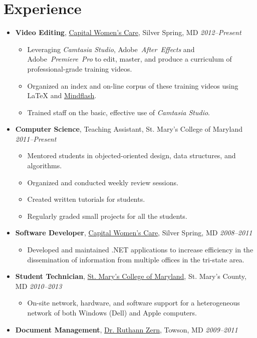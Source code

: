\documentclass[11pt,letterpaper]{article}
\makeatletter
\newcommand{\position}[5]{\item%
  \begin{tabular*}{1.0\linewidth}{l@{\extracolsep{\fill}}r}
    #1 & #2\\
    \textit{#3} & \textit{#4---#5}
  \end{tabular*}}
\renewcommand{\position}[6][]{%
\item[#1] \hspace*{-2em}\textbf{#4}, #2, #3\hfill
  \textit{#5--#6}\vspace*{-.8em}}
\newcommand{\cwc}{\href{http://www.cwcare.net}{Capital Women's Care}}
\newcommand{\software}[1]{\textsl{#1}}
\makeatother
\begin{document}
\section*{Experience}
\begin{itemize}
\position \cwc
          {Silver Spring, MD}
          {Video Editing}
          {2012}{Present}
          \begin{itemize}
          \item Leveraging \software{Camtasia Studio},
            Adobe~\software{After~Effects} and
            Adobe~\software{Premiere~Pro} to edit, master, and produce
            a curriculum of professional-grade training videos.
          \item Organized an index and on-line corpus of these training
            videos using \LaTeX{} and
            \href{http://www.mindflash.com/}{Mindflash}.
          \item Trained staff on the basic, effective use of
            \software{Camtasia Studio}.
          \end{itemize}

\position {Teaching Assistant}
          {St. Mary's College of Maryland}
          {Computer Science}
          {2011}{Present}
          \begin{itemize}
          \item Mentored students in objected-oriented design, data
            structures, and algorithms.
          \item Organized and conducted weekly review sessions.
          \item Created written tutorials for students.
          \item Regularly graded small projects for all the students.
          \end{itemize}

\position \cwc
          {Silver Spring, MD}
          {Software Developer}
          {2008}{2011}
          \begin{itemize}
          \item Developed and maintained .NET applications to increase
            efficiency in the dissemination of information from
            multiple offices in the tri-state area.
          \end{itemize}

\position {\href{http://oit.smcm.edu}
                {St. Mary's College of Maryland}}
          {St. Mary's County, MD}
          {Student Technician}
          {2010}{2013}
          \begin{itemize}
          \item On-site network, hardware, and software support for a
            heterogeneous network of both Windows (Dell) and Apple
            computers.
          \end{itemize}

\position {\href{http://www.cwcare.net/Provider.aspx?pid=1269}
                {Dr. Ruthann Zern}}
          {Towson, MD}
          {Document Management}
          {2009}{2011}
\end{itemize}
\end{document}

